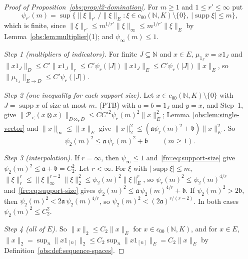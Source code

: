 \documentclass[11pt]{amsart}
\theoremstyle{definition}
\theoremstyle{remark}
\numberwithin{equation}{section}
\newcommand{\N}{\mathbb N}
\newcommand{\abs}[1]{\lvert #1\rvert}
\newcommand{\norm}[1]{\lVert #1\rVert}
\theoremstyle{plain}
\theoremstyle{definition}
\theoremstyle{plain}
\newcommand{\cP}{\mathcal P}
\begin{document}
\begin{proof}[Proof of Proposition~\ref{obs:prop:l2-domination}]
For $m\ge1$ and $1\le r'\le\infty$ put
\[
 \psi_{r'}(m)=\sup\{\norm\xi_{r'}/\norm\xi_E:\xi\in c_{00}(\N,K)\setminus\{0\},\ \abs{\operatorname{supp}\xi}\le m\},
\]
which is finite, since $\norm\xi_{r'}\le m^{1/r'}\norm\xi_\infty\le m^{1/r'}\norm\xi_E$ by
Lemma~\ref{obs:lem:multiplier}(1); and $\psi_\infty(m)\le1$.

\emph{Step 1 (multipliers of indicators).} For finite $J\subseteq\N$ and $x\in E$, $\mu_{1_J}x=x1_J$ and
$\norm{x1_J}_D\le C'\norm{x1_J}_r\le C'\psi_r(\abs J)\norm{x1_J}_E\le C'\psi_r(\abs J)\norm x_E$, so
$\norm{\mu_{1_J}}_{E\to D}\le C'\psi_r(\abs J)$.

\emph{Step 2 (one inequality for each support size).} Let $x\in c_{00}(\N,K)\setminus\{0\}$ with $J=\operatorname{supp}x$
of size at most $m$. \textup{(PTB)} with $a=b=1_J$ and $y=x$, and Step~1, give
$\norm{\cP_<(x\otimes x)}_{D\otimes_\pi D}\le CC'^2\psi_r(m)^2\norm x_E^2$; Lemma~\ref{obs:lem:single-vector} and
$\norm x_\infty\le\norm x_E$ give $\norm x_2^2\le(\mathfrak a\psi_r(m)^2+\mathfrak b)\norm x_E^2$. So
\begin{equation}\label{frc:eq:support-size}
 \psi_2(m)^2\le\mathfrak a\,\psi_r(m)^2+\mathfrak b\qquad(m\ge1).
\end{equation}

\emph{Step 3 (interpolation).} If $r=\infty$, then $\psi_\infty\le1$ and~\eqref{frc:eq:support-size} give
$\psi_2(m)^2\le\mathfrak a+\mathfrak b=C_2^2$. Let $r<\infty$. For $\xi$ with $\abs{\operatorname{supp}\xi}\le m$,
$\norm\xi_r^r\le\norm\xi_\infty^{r-2}\norm\xi_2^2\le\psi_2(m)^2\norm\xi_E^r$, so $\psi_r(m)^2\le\psi_2(m)^{4/r}$
and~\eqref{frc:eq:support-size} gives $\psi_2(m)^2\le\mathfrak a\,\psi_2(m)^{4/r}+\mathfrak b$. If
$\psi_2(m)^2>2\mathfrak b$, then $\psi_2(m)^2<2\mathfrak a\,\psi_2(m)^{4/r}$, so $\psi_2(m)^2<(2\mathfrak a)^{r/(r-2)}$.
In both cases $\psi_2(m)^2\le C_2^2$.

\emph{Step 4 (all of $E$).} So $\norm x_2\le C_2\norm x_E$ for $x\in c_{00}(\N,K)$, and for $x\in E$,
$\norm x_2=\sup_n\norm{x1_{[n]}}_2\le C_2\sup_n\norm{x1_{[n]}}_E=C_2\norm x_E$ by
Definition~\ref{obs:def:sequence-spaces}.
\end{proof}
\end{document}
